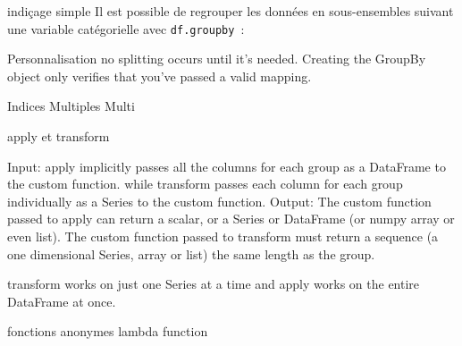 \begin{frame}{indiçage simple}
  Il est possible de regrouper les données en sous-ensembles suivant une variable catégorielle avec \texttt{df.groupby}~:
\end{frame}

\begin{frame}{Personnalisation}
  no splitting occurs until it’s needed. Creating the GroupBy object only verifies that you’ve passed a valid mapping.
\end{frame}

\begin{frame}{Indices Multiples}
  Multi
\end{frame}

\begin{frame}{apply et transform}
 
  Input:
  apply implicitly passes all the columns for each group as a DataFrame to the custom function.
  while transform passes each column for each group individually as a Series to the custom function.
Output:
  The custom function passed to apply can return a scalar, or a Series or DataFrame (or numpy array or even list).
  The custom function passed to transform must return a sequence (a one dimensional Series, array or list) the same length as the group.

  transform works on just one Series at a time and apply works on the entire DataFrame at once.

\end{frame}

\begin{frame}{fonctions anonymes}
  lambda function
\end{frame}
